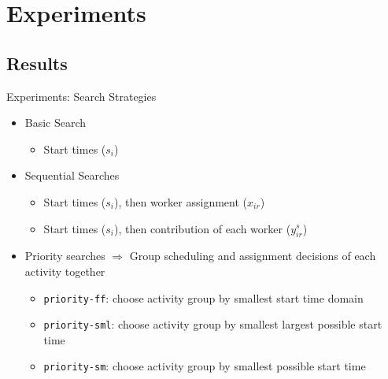 \documentclass{beamer}
\begin{document}
\section{Experiments}

\subsection{Results}
\begin{frame}{Experiments: Search Strategies}
	\begin{itemize}
		\item Basic Search
		\begin{itemize}
			\item  Start times ($s_i$)
		\end{itemize}\pause
			\vspace{2mm}
		\item Sequential Searches
		\begin{itemize}
			\item  Start times ($s_i$), then worker assignment ($x_{ir}$)
			\item  Start times ($s_i$), then contribution of each worker ($y_{ir}^s$)
		\end{itemize}\pause
			\vspace{2mm}
		\item Priority searches $\Rightarrow$ Group scheduling and assignment decisions of each activity together
		\begin{itemize}
			\item {\tt priority-ff}: choose activity group by smallest start time domain 
			\item {\tt priority-sml}: choose activity group by smallest largest possible start time
			\item {\tt priority-sm}: choose activity group by smallest possible start time
		\end{itemize}
	\end{itemize}
\end{frame}
\end{document}

